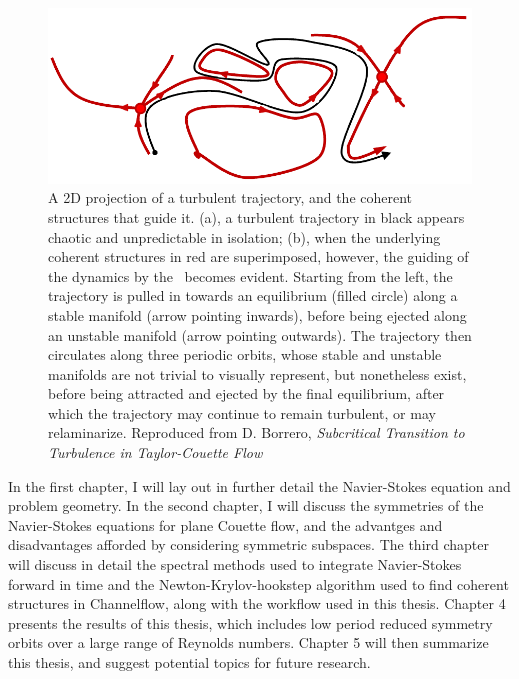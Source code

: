 \begin{figure}[h]
\centerline{
\includegraphics[width=\textwidth]{Figs/phaseSpaceTraj.pdf}}
\caption{A 2D projection of a turbulent trajectory, and the coherent structures that guide it. (a), a turbulent trajectory in black appears chaotic and unpredictable in isolation; (b), when the underlying coherent structures in red are superimposed, however, the guiding of the dynamics by the \ecs\ becomes evident. Starting from the left, the trajectory is pulled in towards an equilibrium (filled circle) along a stable manifold (arrow pointing inwards), before being ejected along an unstable manifold (arrow pointing outwards). The trajectory then circulates along three periodic orbits, whose stable and unstable manifolds are not trivial to visually represent, but nonetheless exist, before being attracted and ejected by the final equilibrium, after which the trajectory may continue to remain turbulent, or may relaminarize. Reproduced from D. Borrero, \emph{Subcritical Transition to Turbulence in Taylor-Couette Flow}  }\label{fig:guidedTurbulence}
\end{figure}
 In the first chapter, I will lay out in further detail the Navier-Stokes equation and problem geometry. In the second chapter, I will discuss the symmetries of the Navier-Stokes equations for plane Couette flow, and the advantges and disadvantages afforded by considering symmetric subspaces. The third chapter will discuss in detail the spectral methods used to integrate Navier-Stokes forward in time and the Newton-Krylov-hookstep algorithm used to find coherent structures in Channelflow, along with the workflow used in this thesis. Chapter 4 presents the results of this thesis, which includes low period reduced symmetry orbits over a large range of Reynolds numbers. Chapter 5 will then summarize this thesis, and suggest potential topics for future research. 